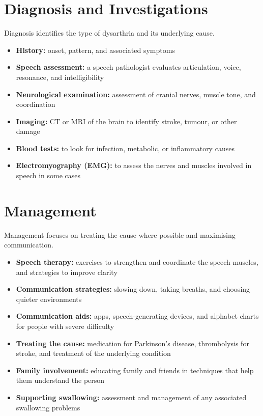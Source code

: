 \section*{Diagnosis and Investigations}
Diagnosis identifies the type of dysarthria and its underlying cause.
\begin{itemize}
    \item \textbf{History:} onset, pattern, and associated symptoms
    \item \textbf{Speech assessment:} a speech pathologist evaluates articulation, voice, resonance, and intelligibility
    \item \textbf{Neurological examination:} assessment of cranial nerves, muscle tone, and coordination
    \item \textbf{Imaging:} CT or MRI of the brain to identify stroke, tumour, or other damage
    \item \textbf{Blood tests:} to look for infection, metabolic, or inflammatory causes
    \item \textbf{Electromyography (EMG):} to assess the nerves and muscles involved in speech in some cases
\end{itemize}

\section*{Management}
Management focuses on treating the cause where possible and maximising communication.
\begin{itemize}
    \item \textbf{Speech therapy:} exercises to strengthen and coordinate the speech muscles, and strategies to improve clarity
    \item \textbf{Communication strategies:} slowing down, taking breaths, and choosing quieter environments
    \item \textbf{Communication aids:} apps, speech-generating devices, and alphabet charts for people with severe difficulty
    \item \textbf{Treating the cause:} medication for Parkinson's disease, thrombolysis for stroke, and treatment of the underlying condition
    \item \textbf{Family involvement:} educating family and friends in techniques that help them understand the person
    \item \textbf{Supporting swallowing:} assessment and management of any associated swallowing problems
\end{itemize}

